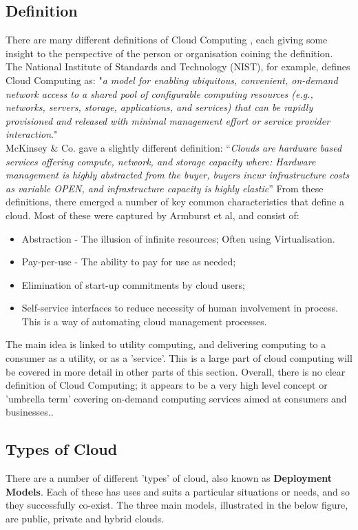 \subsection{Definition}
There are many different definitions of Cloud Computing \cite{21definitions}, each giving some insight to the perspective of the person or organisation coining the definition. The National Institute of Standards and Technology (NIST), for example, defines Cloud Computing as: "\textit{a model for enabling ubiquitous, convenient, on-demand network access to a shared pool of configurable computing resources (e.g., networks, servers, storage, applications, and services) that can be rapidly provisioned and released with minimal management effort or service provider interaction}." \cite{nistcloud} \\
McKinsey \& Co. gave a slightly different definition: “\textit{Clouds are hardware based services offering compute, network, and storage capacity where: Hardware management is highly abstracted from the buyer, buyers incur infrastructure costs as variable OPEN, and infrastructure capacity is highly elastic}” \cite{mickinseyclearingtheair} 
From these definitions, there emerged a number of key common characteristics that define a cloud. Most of these were captured by Armburst et al\cite{armbrustberkeleyview}, and consist of:

\begin{itemize}
\itemsep0em
\item Abstraction - The illusion of infinite resources; Often using Virtualisation. 
\item Pay-per-use - The ability to pay for use as needed;
\item Elimination of start-up commitments by cloud users;
\item Self-service interfaces to reduce necessity of human involvement in process. This is a way of automating cloud management processes. 
\end{itemize} 

The main idea is linked to utility computing, and delivering computing to a consumer as a utility, or as a 'service'\cite{armbrustberkeleyview}. This is a large part of cloud computing will be covered in more detail in other parts of this section. 
Overall, there is no clear definition of Cloud Computing; it appears to be a very high level concept or 'umbrella term' covering on-demand computing services aimed at consumers and businesses.\cite{buyyacloudemerging}.   
 
\subsection{Types of Cloud}
There are a number of different 'types' of cloud, also known as \textbf{Deployment Models}. Each of these has uses and suits a particular situations or needs, and so they successfully co-exist. The three main models, illustrated in the below figure, are public, private and hybrid clouds. 

